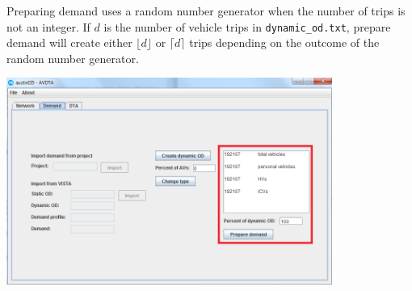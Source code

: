 Preparing demand uses a random number generator when the number of trips is not an integer. If $d$ is the number of vehicle trips in \texttt{dynamic\_od.txt}, prepare demand will create either $\lfloor d\rfloor$ or $\lceil d\rceil$ trips depending on the outcome of the random number generator.
\begin{center}
\includegraphics[width=0.8\textwidth]{images/demand4.png}
\end{center}